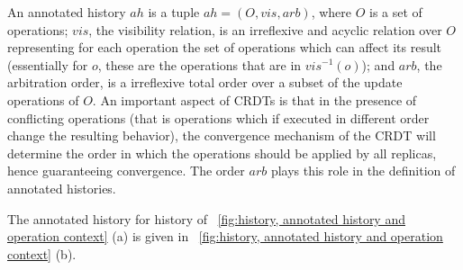 An annotated history $ah$ is a tuple $ah = (O,\mathit{vis},\mathit{arb})$, where
$O$ is a set of operations; $\mathit{vis}$, the visibility relation, is
an irreflexive and acyclic relation over $O$ representing for each
operation the set of operations which can affect its result
(essentially for $o$, these are the operations that are in
$\mathit{vis}^{-1}(o)$); and $\mathit{arb}$, the arbitration order, is
a irreflexive total order over a subset of the update operations of
$O$.
An important aspect of CRDTs is that in the presence of conflicting
operations (that is operations which if executed in different order
change the resulting behavior), the convergence mechanism of the CRDT
will determine the order in which the operations should be applied by
all replicas, hence guaranteeing convergence.
The order $\mathit{arb}$ plays this role in the definition of
annotated histories.
%

{\color {red}The annotated history for history of \figurename~\ref{fig:history, annotated history and operation context} (a) is given in \figurename~\ref{fig:history, annotated
history and operation context} (b).} %




